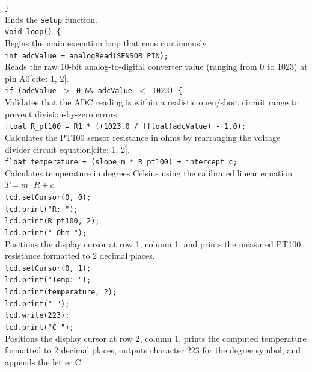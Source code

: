 \documentclass[12pt, a4paper]{article}
\begin{document}
	\noindent\texttt{\}}\\
	Ends the \texttt{setup} function.
	\\[6pt]
	
	\noindent\texttt{void loop() \{}\\
	Begins the main execution loop that runs continuously.
	\\[6pt]
	
	\noindent\texttt{int adcValue = analogRead(SENSOR\_PIN);}\\
	Reads the raw 10-bit analog-to-digital converter value (ranging from 0 to 1023) at pin A0[cite: 1, 2].
	\\[6pt]
	
	\noindent\texttt{if (adcValue $>$ 0 \&\& adcValue $<$ 1023) \{}\\
	Validates that the ADC reading is within a realistic open/short circuit range to prevent division-by-zero errors.
	\\[6pt]
	
	\noindent\texttt{float R\_pt100 = R1 * ((1023.0 / (float)adcValue) - 1.0);}\\
	Calculates the PT100 sensor resistance in ohms by rearranging the voltage divider circuit equation[cite: 1, 2].
	\\[6pt]
	
	\noindent\texttt{float temperature = (slope\_m * R\_pt100) + intercept\_c;}\\
	Calculates temperature in degrees Celsius using the calibrated linear equation $T = m \cdot R + c$.
	\\[6pt]
	
	\noindent\texttt{lcd.setCursor(0, 0);}\\
	\texttt{lcd.print("R: ");}\\
	\texttt{lcd.print(R\_pt100, 2);}\\
	\texttt{lcd.print(" Ohm   ");}\\
	Positions the display cursor at row 1, column 1, and prints the measured PT100 resistance formatted to 2 decimal places.
	\\[6pt]
	
	\noindent\texttt{lcd.setCursor(0, 1);}\\
	\texttt{lcd.print("Temp: ");}\\
	\texttt{lcd.print(temperature, 2);}\\
	\texttt{lcd.print(" ");}\\
	\texttt{lcd.write(223);}\\
	\texttt{lcd.print("C  ");}\\
	Positions the display cursor at row 2, column 1, prints the computed temperature formatted to 2 decimal places, outputs character 223 for the degree symbol, and appends the letter C.
	\\[6pt]
	
\end{document}
